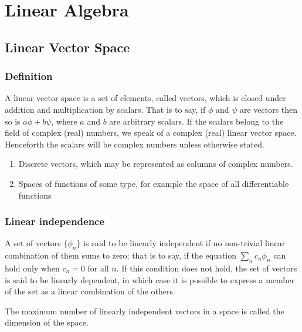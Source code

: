 \chapter{Linear Algebra}
\section{Linear Vector Space}
\subsection{Definition}
\begin{newdef}
A linear vector space is a set of elements, called vectors, which is closed under addition and multiplication by scalars. That is to say, if $\phi$ and $\psi$ are vectors then so is $a\phi+b\psi$, where $a$ and $b$ are arbitrary scalars. If the scalars belong to the field of complex (real) numbers, we speak of a complex (real) linear vector space. Henceforth the scalars will be complex numbers unless otherwise stated.
\end{newdef}

\begin{example}
\begin{enumerate}
\item Discrete vectors, which may be represented as columns of complex numbers.
\item Spaces of functions of some type, for example the space of all differentiable functions
\end{enumerate}
\end{example}

\subsection{Linear independence}
\begin{newdef}
A set of vectors $\{\phi_n\}$ is said to be linearly independent if no non-trivial linear combination of them sums to zero; that is to say, if the equation $\sum_{n} c_n \phi_n$ can hold only when $c_n=0$ for all $n$. If this condition does not hold, the set of vectors is said to be linearly dependent, in which case it is possible to express a member of the set as a linear combination of the others.
\end{newdef}

\begin{newdef}[Dimension]
The maximum number of linearly independent vectors in a space is called the dimension of the space.
\end{newdef}

